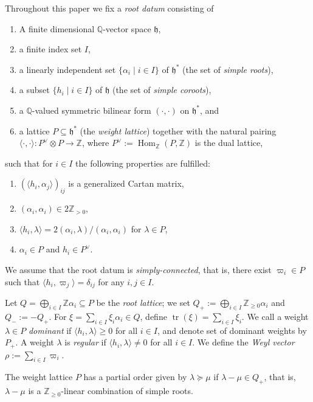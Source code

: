 \documentclass[final]{amsart}
\theoremstyle{plain}
\theoremstyle{definition}
\newcommand{\bbQ}{\mathbb Q}
\newcommand{\bbZ}{\mathbb Z}
\newcommand{\frakh}{\mathfrak h}
\DeclareMathOperator{\trace}{tr}
\DeclareMathOperator{\Hom}{Hom}
\begin{document}
Throughout this paper we fix a \emph{root datum} consisting of
\begin{enumerate}
	\item A finite dimensional $\bbQ$-vector space $\frakh$,
	\item a finite index set $I$,
	\item a linearly independent set $\{ \alpha_i \mid i \in I \}$ of $\frakh^*$ (the set of \emph{simple roots}),
	\item a subset $\{ h_i \mid i\in I\}$ of $\frakh$ (the set of \emph{simple coroots}),
	\item a $\bbQ$-valued symmetric bilinear form $(\cdot, \cdot)$ on $\frakh^*$, and
	\item a lattice $P \subseteq \frakh^*$ (the \emph{weight lattice}) together with the natural pairing $\langle \cdot, \cdot\rangle \colon P^\vee \otimes P \to \bbZ$, where $P^\vee := \Hom_\bbZ(P, \bbZ)$ is the dual lattice,
\end{enumerate}
such that for $i\in I$ the following properties are fulfilled:
\begin{enumerate}
	\item $(\langle h_i, \alpha_j\rangle)_{ij}$ is a generalized Cartan matrix,
	\item $(\alpha_i, \alpha_i) \in 2\bbZ_{>0}$,
	\item $\langle h_i, \lambda\rangle = 2(\alpha_i, \lambda)/(\alpha_i, \alpha_i)$ for $\lambda \in P$,
	\item $\alpha_i\in P$ and $h_i\in P^\vee$.
\end{enumerate}

We assume that the root datum is \emph{simply-connected}, that is, there exist $\varpi_i \in P$ such that $\langle h_i, \varpi_j\rangle = \delta_{ij}$ for any $i, j\in I$.

Let $Q = \bigoplus_{i\in I}\bbZ\alpha_i \subseteq P$ be the \emph{root lattice}; we set $Q_+ := \bigoplus_{i\in I} \bbZ_{\ge0} \alpha_i$ and $Q_- := -Q_+$.
For $\xi = \sum_{i\in I} \xi_i\alpha_i \in Q$, define $\trace(\xi) = \sum_{i\in I} \xi_i$.
We call a weight $\lambda \in P$ \emph{dominant} if $\langle h_i, \lambda\rangle \ge 0$ for all $i\in I$, and denote set of dominant weights by $P_+$.
A weight $\lambda$ is \emph{regular} if $\langle h_i, \lambda\rangle \neq 0$ for all $i\in I$.
We define the \emph{Weyl vector} $\rho := \sum_{i\in I} \varpi_i$.

The weight lattice $P$ has a partial order given by $\lambda \succeq \mu$ if $\lambda - \mu \in Q_+$, that is, $\lambda - \mu$ is a $\bbZ_{\ge0}$-linear combination of simple roots.
\end{document}
